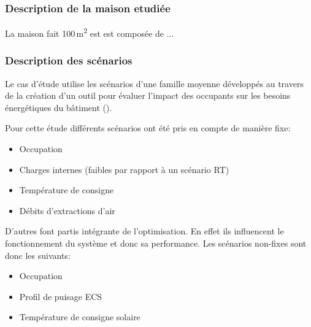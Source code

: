 \subsubsection{Description de la maison etudiée} %
\label{ssub:description_de_la_maison_etudiee}
La maison fait 100\,\si{m^{2}} est est composée de ...


\subsubsection{Description des scénarios} %
\label{ssub:description_des_scenarios}
Le cas d’étude utilise les scénarios d’une famille moyenne développés au travers de
la création d’un outil pour évaluer l’impact des occupants sur les besoins
énergétiques du bâtiment (\cite{Vorger2014}).

Pour cette étude différents scénarios ont été pris en compte de manière fixe:
\begin{itemize}
    \item Occupation
    \item Charges internes (faibles par rapport à un scénario RT)
    \item Température de consigne
    \item Débits d’extractions d’air
\end{itemize}

D’autres font partis intégrante de l’optimisation. En effet ils influencent le
fonctionnement du système et donc sa performance. Les scénarios non-fixes sont donc
les suivants:
\begin{itemize}
    \item Occupation
    \item Profil de puisage ECS
    \item Température de consigne solaire
\end{itemize}



